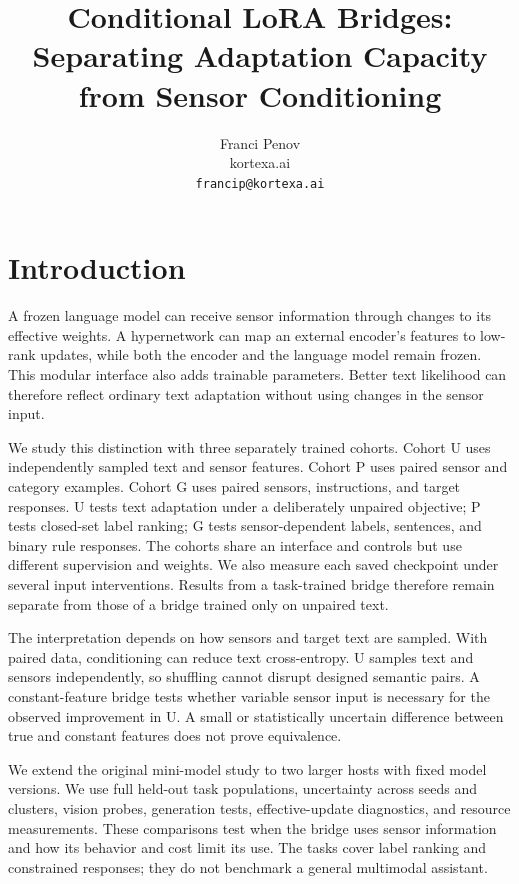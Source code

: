 \documentclass[11pt]{article}
\title{Conditional LoRA Bridges:\\Separating Adaptation Capacity from Sensor Conditioning}
\author{Franci Penov\\kortexa.ai\\\texttt{francip@kortexa.ai}}
\date{\RevisionDate}
\begin{document}
\maketitle
\begin{abstract}

\end{abstract}

\section{Introduction}
A frozen language model can receive sensor information through changes to its
effective weights. A hypernetwork can map an external encoder's features to
low-rank updates, while both the encoder and the language model remain frozen.
This modular interface also adds trainable parameters. Better text likelihood
can therefore reflect ordinary text adaptation without using changes in the
sensor input.

We study this distinction with three separately trained cohorts. Cohort U uses
independently sampled text and sensor features. Cohort P uses paired sensor and
category examples. Cohort G uses paired sensors, instructions, and target
responses. U tests text adaptation under a deliberately unpaired objective; P
tests closed-set label ranking; G tests sensor-dependent labels, sentences, and
binary rule responses. The cohorts share an interface and controls but use
different supervision and weights. We also measure each saved checkpoint under
several input interventions. Results from a task-trained bridge therefore remain
separate from those of a bridge trained only on unpaired text.

The interpretation depends on how sensors and target text are sampled. With
paired data, conditioning can reduce text cross-entropy. U samples text and
sensors independently, so shuffling cannot disrupt designed semantic pairs.
A constant-feature bridge tests whether variable sensor input is necessary for
the observed improvement in U. A small or statistically uncertain difference
between true and constant features does not prove equivalence.

We extend the original mini-model study to two larger hosts with fixed model
versions. We use full held-out task populations, uncertainty across seeds and
clusters, vision probes, generation tests, effective-update diagnostics, and
resource measurements. These comparisons test when the bridge uses sensor
information and how its behavior and cost limit its use. The tasks cover label
ranking and constrained responses; they do not benchmark a general multimodal
assistant.
\end{document}
